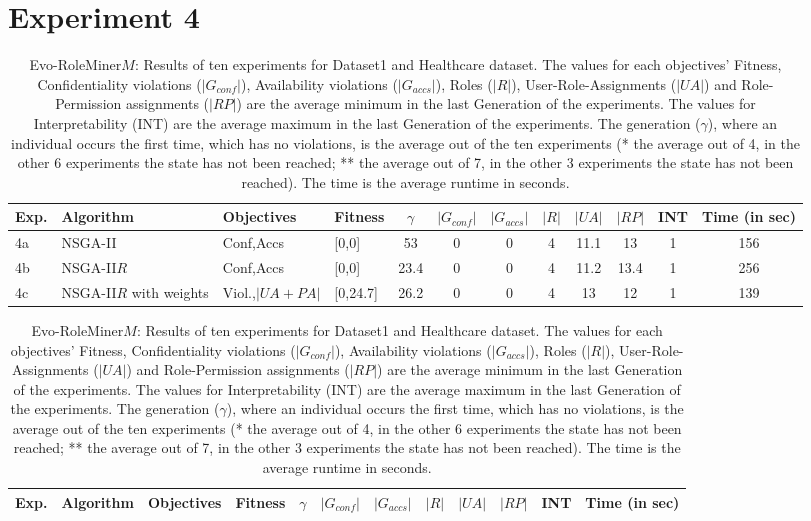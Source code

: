 \section{Experiment 4}
\label{sec:A_Exp4}
	\begin{table}[H]
		\centering
		\caption{Evo-RoleMiner$M$: Results of ten experiments for Dataset1 and Healthcare dataset. The values for each objectives' Fitness, Confidentiality violations ($|G_{conf}|$), Availability violations ($|G_{accs}|$), Roles ($|R|$), User-Role-Assignments ($|UA|$) and Role-Permission assignments ($|RP|$) are the average minimum in the last Generation of the experiments. The values for Interpretability (INT) are the average maximum in the last Generation of the experiments. The generation ($\gamma$), where an individual occurs the first time, which has no violations, is the average out of the ten experiments (* the average out of 4, in the other 6 experiments the state has not been reached; ** the average out of 7, in the other 3 experiments the state has not been reached). The time is the average runtime in seconds.}
		\label{tab:exp4_results}
		\begin{adjustbox}{width=\textwidth}
			\begin{tabular}{|l|l|l|l|c|c|c|c|c|c|c|c|}
				\hline
				\rowcolor{myGray} 
				\textbf{Exp.} & \textbf{Algorithm} & \textbf{Objectives} & \textbf{Fitness} & $\gamma$ & \textbf{$|G_{conf}|$} & \textbf{$|G_{accs}|$} & \textbf{$|R|$} & \textbf{$|UA|$} & \textbf{$|RP|$} & \textbf{INT} & \textbf{Time (in sec)}\\ \hline
				4a & NSGA-II & Conf,Accs &  [0,0] &  53 & 0   &   0 & 4   &   11.1   &   13   &   1    & 156\\ \hline
				4b & NSGA-II$R$ & Conf,Accs &   [0,0] &   23.4 &0   &   0 & 4   &   11.2   &   13.4   &   1    & 256\\ \hline
				4c & NSGA-II$R$ with weights & Viol.,$|UA+PA|$ &   [0,24.7] &   26.2 &   0 & 0 &4   &   13   &   12   &   1    & 139\\ \hline			
			\end{tabular}
		\end{adjustbox}
		\begin{adjustbox}{width=\textwidth}
			\begin{tabular}{|l|l|l|l|c|c|c|c|c|c|c|c|}
				\hline
				\rowcolor{myGray} 
				\textbf{Exp.} & \textbf{Algorithm} & \textbf{Objectives} & \textbf{Fitness} & $\gamma$ & \textbf{$|G_{conf}|$} & \textbf{$|G_{accs}|$} & \textbf{$|R|$} & \textbf{$|UA|$} & \textbf{$|RP|$} & \textbf{INT} & \textbf{Time (in sec)}\\ \hline

\end{tabular}
\end{adjustbox}
\end{table}

